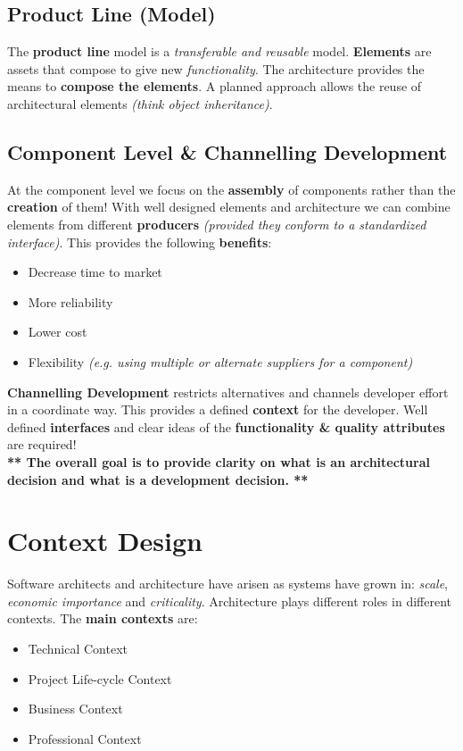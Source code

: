 \documentclass[a4paper]{article}
\begin{document}
\subsection{Product Line (Model)}
The \textbf{product line} model is a \textit{transferable and reusable} model. \textbf{Elements} are assets that compose to give new \textit{functionality}. The architecture provides the means to \textbf{compose the elements}. A planned approach allows the reuse of architectural elements \textit{(think object inheritance)}.

\subsection{Component Level \& Channelling Development}
At the component level we focus on the \textbf{assembly} of components rather than the \textbf{creation} of them! With well designed elements and architecture we can combine elements from different \textbf{producers} \textit{(provided they conform to a standardized interface)}. This provides the following \textbf{benefits}:
\begin{itemize}
\item Decrease time to market
\item More reliability
\item Lower cost
\item Flexibility \textit{(e.g. using multiple or alternate suppliers for a component)}\\
\end{itemize}

\textbf{Channelling Development} restricts alternatives and channels developer effort in a coordinate way. This provides a defined \textbf{context} for the developer. Well defined \textbf{interfaces} and clear ideas of the \textbf{functionality \& quality attributes} are required!\\

\textbf{** The overall goal is to provide clarity on what is an architectural decision and what is a development decision. **}
\newpage


\section{Context Design}
Software architects and architecture have arisen as systems have grown in: \textit{scale}, \textit{economic importance} and \textit{criticality}. Architecture plays different roles in different contexts. The \textbf{main contexts} are:
\begin{itemize}
\item Technical Context
\item Project Life-cycle Context
\item Business Context
\item Professional Context
\end{itemize}
\end{document}
